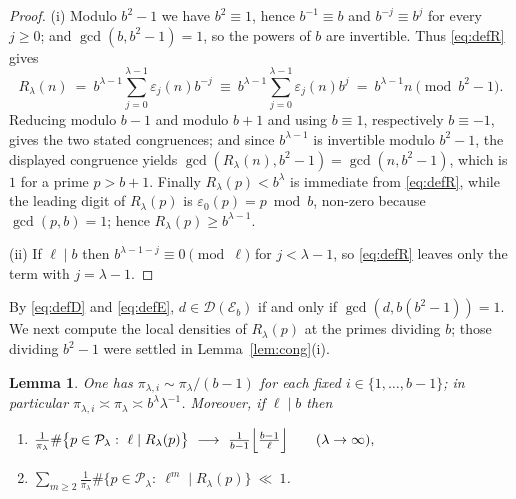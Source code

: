 \documentclass[11pt,a4paper]{article}
\theoremstyle{plain}
\newtheorem{lemma}[theorem]{Lemma}
\theoremstyle{definition}
\newcommand{\eps}{\varepsilon}
\numberwithin{equation}{section}
\begin{document}
\begin{proof}
(i) Modulo $b^{2}-1$ we have $b^{2}\equiv1$, hence $b^{-1}\equiv b$ and $b^{-j}\equiv b^{j}$ for every
$j\ge0$; and $\gcd(b,b^{2}-1)=1$, so the powers of $b$ are invertible. Thus \eqref{eq:defR} gives
\[
R_\lambda(n)\ =\ b^{\lambda-1}\sum_{j=0}^{\lambda-1}\eps_j(n)b^{-j}
\ \equiv\ b^{\lambda-1}\sum_{j=0}^{\lambda-1}\eps_j(n)b^{j}
\ =\ b^{\lambda-1}n\pmod{b^{2}-1}.
\]
Reducing modulo $b-1$ and modulo $b+1$ and using $b\equiv1$, respectively $b\equiv-1$, gives the two
stated congruences; and since $b^{\lambda-1}$ is invertible modulo $b^{2}-1$, the displayed congruence
yields $\gcd(R_\lambda(n),b^{2}-1)=\gcd(n,b^{2}-1)$, which is $1$ for a prime $p>b+1$. Finally
$R_\lambda(p)<b^{\lambda}$ is immediate from \eqref{eq:defR}, while the leading digit of $R_\lambda(p)$ is
$\eps_0(p)=p\bmod b$, non-zero because $\gcd(p,b)=1$; hence $R_\lambda(p)\ge b^{\lambda-1}$.

(ii) If $\ell\mid b$ then $b^{\lambda-1-j}\equiv0\pmod\ell$ for $j<\lambda-1$, so \eqref{eq:defR} leaves
only the term with $j=\lambda-1$.
\end{proof}

By \eqref{eq:defD} and \eqref{eq:defE}, $d\in\mathcal D(\mathcal E_b)$ if and only if
$\gcd(d,b(b^{2}-1))=1$. We next compute the local densities of $R_\lambda(p)$ at the primes dividing
$b$; those dividing $b^{2}-1$ were settled in Lemma~\ref{lem:cong}(i).

\begin{lemma}\label{lem:dens}
One has $\pi_{\lambda,i}\sim\pi_\lambda/(b-1)$ for each fixed $i\in\{1,\dots,b-1\}$; in particular
$\pi_{\lambda,i}\asymp\pi_\lambda\asymp b^{\lambda}\lambda^{-1}$. Moreover, if
$\ell\mid b$ then
\begin{enumerate}
\item[\textup{(i)}] $\frac{1}{\pi_\lambda}\#\bigl\{p\in\mathcal P_\lambda:\ \ell\mid R_\lambda(p)\bigr\}
\ \longrightarrow\ \frac{1}{b-1}\Bigl\lfloor\frac{b-1}{\ell}\Bigr\rfloor\qquad(\lambda\to\infty),$

\item[\textup{(ii)}] $\displaystyle\sum_{m\ge2}\frac{1}{\pi_\lambda}
\#\bigl\{p\in\mathcal P_\lambda:\ \ell^{m}\mid R_\lambda(p)\bigr\}\ \ll\ 1$.
\end{enumerate}
\end{lemma}
\end{document}
